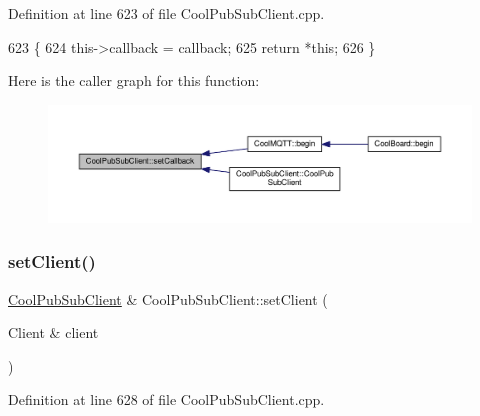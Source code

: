 Definition at line 623 of file Cool\+Pub\+Sub\+Client.\+cpp.


\begin{DoxyCode}
623                                                                        \{
624     this->callback = callback;
625     \textcolor{keywordflow}{return} *\textcolor{keyword}{this};
626 \}
\end{DoxyCode}
Here is the caller graph for this function\+:\nopagebreak
\begin{figure}[H]
\begin{center}
\leavevmode
\includegraphics[width=350pt]{d8/d4b/class_cool_pub_sub_client_ac5cab7658f1bdded32131241e468e661_icgraph}
\end{center}
\end{figure}
\mbox{\label{class_cool_pub_sub_client_a7ee119b786010561ab6a9afa0798e91d}} 
\subsubsection{\texorpdfstring{set\+Client()}{setClient()}}
{\footnotesize\ttfamily \hyperlink{class_cool_pub_sub_client}{Cool\+Pub\+Sub\+Client} \& Cool\+Pub\+Sub\+Client\+::set\+Client (\begin{DoxyParamCaption}\item[{Client \&}]{client }\end{DoxyParamCaption})}



Definition at line 628 of file Cool\+Pub\+Sub\+Client.\+cpp.


